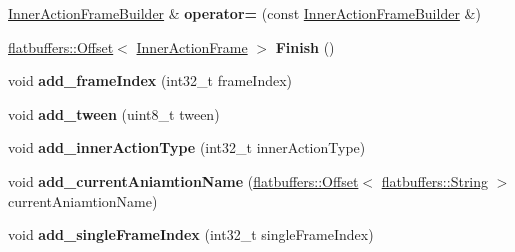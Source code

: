 \begin{DoxyCompactItemize}
\item 
\mbox{\label{structflatbuffers_1_1InnerActionFrameBuilder_a55e0a9436a87e68f52b79703cb81d224}} 
\hyperlink{structflatbuffers_1_1InnerActionFrameBuilder}{Inner\+Action\+Frame\+Builder} \& {\bfseries operator=} (const \hyperlink{structflatbuffers_1_1InnerActionFrameBuilder}{Inner\+Action\+Frame\+Builder} \&)
\item 
\mbox{\label{structflatbuffers_1_1InnerActionFrameBuilder_a8e517c89a1f39b0404d164ab22e33e06}} 
\hyperlink{structflatbuffers_1_1Offset}{flatbuffers\+::\+Offset}$<$ \hyperlink{structflatbuffers_1_1InnerActionFrame}{Inner\+Action\+Frame} $>$ {\bfseries Finish} ()
\item 
\mbox{\label{structflatbuffers_1_1InnerActionFrameBuilder_ab8e7da79b4d8cca30c1e047ec23178f7}} 
void {\bfseries add\+\_\+frame\+Index} (int32\+\_\+t frame\+Index)
\item 
\mbox{\label{structflatbuffers_1_1InnerActionFrameBuilder_a3a7cec4c31be8d6b9aa3602bd88da08f}} 
void {\bfseries add\+\_\+tween} (uint8\+\_\+t tween)
\item 
\mbox{\label{structflatbuffers_1_1InnerActionFrameBuilder_a25520826a3bda28c4359f63275a7eea8}} 
void {\bfseries add\+\_\+inner\+Action\+Type} (int32\+\_\+t inner\+Action\+Type)
\item 
\mbox{\label{structflatbuffers_1_1InnerActionFrameBuilder_a7d5d455cbc8cc411b8d79089059f7578}} 
void {\bfseries add\+\_\+current\+Aniamtion\+Name} (\hyperlink{structflatbuffers_1_1Offset}{flatbuffers\+::\+Offset}$<$ \hyperlink{structflatbuffers_1_1String}{flatbuffers\+::\+String} $>$ current\+Aniamtion\+Name)
\item 
\mbox{\label{structflatbuffers_1_1InnerActionFrameBuilder_ac563e328f25c2f10dc2f2ee106fc4056}} 
void {\bfseries add\+\_\+single\+Frame\+Index} (int32\+\_\+t single\+Frame\+Index)
\item 
\mbox{\label{structflatbuffers_1_1InnerActionFrameBuilder_a92f290cde86c60b80d5220a61762ca12}} 

\end{DoxyCompactItemize}
